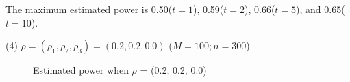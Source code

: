 \documentclass[12pt]{report}
\begin{document}
 The maximum estimated power is 0.50($t=1$), 0.59($t=2$), 0.66($t=5$), and 0.65($t=10$).

 (4) $\rho = (\rho_{1}, \rho_{2}, \rho_{3}) = (0.2, 0.2, 0.0)$ ($M = 100; n = 300$)


\begin{figure}[H]
\captionsetup{format=plain}
\centering
{}
\caption{Estimated power when $\rho$ = (0.2, 0.2, 0.0)}
\label{fig:smulti4}    
\end{figure} 
\end{document}
